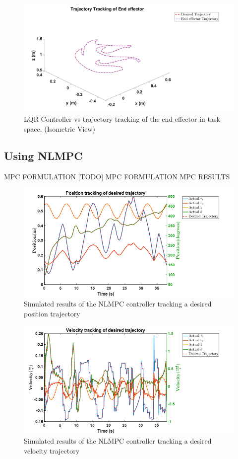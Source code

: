 \documentclass{UoNMCHA}
\numberwithin{equation}{section}
\begin{document}
	\begin{figure}[H]
		\begin{center}
			\includegraphics[width=.8\linewidth]{figs/Picture323}
			\caption{LQR Controller vs trajectory tracking of the end effector in task space. (Isometric View)}
			\label{figs/Picture323}
		\end{center}
	\end{figure}
	
	\newpage
	\subsection{Using NLMPC}
	
	MPC FORMULATION
	[TODO] MPC FORMULATION
	MPC RESULTS
	
	\begin{figure}[H]
		\begin{center}
			\includegraphics[width=.8\linewidth]{figs/Picture33}
			\caption{Simulated results of the NLMPC controller tracking a desired position trajectory}
			\label{figs/Picture33}
		\end{center}
	\end{figure}
	
	
	\begin{figure}[H]
		\begin{center}
			\includegraphics[width=.8\linewidth]{figs/Picture34}
			\caption{Simulated results of the NLMPC controller tracking a desired velocity trajectory}
			\label{figs/Picture34}
		\end{center}
	\end{figure}
	
\end{document}
